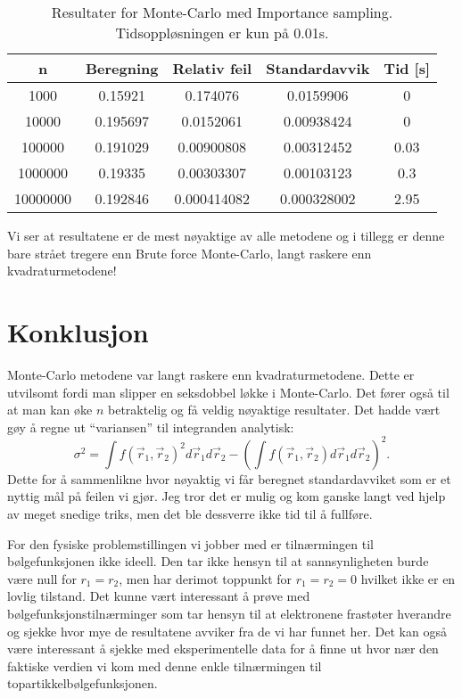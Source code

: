 \documentclass[norsk, 12pt]{article}
\newcommand{\vr}{\vec{r}}
\begin{document}
\begin{table}[h!]
 \centering
 \begin{tabular}{|c|c|c|c|c|}\hline
 n &Beregning &Relativ feil &Standardavvik &Tid [s] \\ \hline
1000      &0.15921      &0.174076             &0.0159906       &0\\
10000      &0.195697      &0.0152061             &0.00938424       &0\\
100000      &0.191029      &0.00900808             &0.00312452       &0.03\\
1000000      &0.19335      &0.00303307             &0.00103123       &0.3\\
10000000      &0.192846      &0.000414082             &0.000328002       &2.95\\ \hline
 \end{tabular}
\caption{Resultater for Monte-Carlo med Importance sampling. Tidsoppløsningen er kun på 0.01s.}
\end{table}

Vi ser at resultatene er de mest nøyaktige av alle metodene og i tillegg er denne bare strået tregere enn Brute force
Monte-Carlo, langt raskere enn kvadraturmetodene!

\section{Konklusjon}
Monte-Carlo metodene var langt raskere enn kvadraturmetodene. Dette er utvilsomt fordi man slipper en seksdobbel løkke
i Monte-Carlo. Det fører også til at man kan øke $n$ betraktelig og få veldig nøyaktige resultater. Det hadde vært gøy
å regne ut ``variansen'' til integranden analytisk:
$$\sigma^2 = \int f(\vr_1, \vr_2)^2 d\vr_1d\vr_2 - \left(\int f(\vr_1, \vr_2) d\vr_1d\vr_2\right)^2.$$
Dette for å sammenlikne hvor nøyaktig vi får beregnet standardavviket som er et nyttig mål på feilen vi gjør.
Jeg tror det er mulig og kom ganske langt ved hjelp av meget snedige triks, men det ble dessverre ikke tid til å fullføre.


For den fysiske problemstillingen vi jobber med er tilnærmingen til bølgefunksjonen ikke ideell. Den tar ikke
hensyn til at sannsynligheten burde være null for $r_1=r_2$, men har derimot toppunkt for $r_1=r_2=0$ hvilket ikke
er en lovlig tilstand. Det kunne vært interessant å prøve med bølgefunksjonstilnærminger som tar hensyn til at elektronene
frastøter hverandre og sjekke hvor mye de resultatene avviker fra de vi har funnet her. Det kan også være interessant
å sjekke med eksperimentelle data for å finne ut hvor nær den faktiske verdien vi kom med denne enkle tilnærmingen
til topartikkelbølgefunksjonen.
\end{document}
